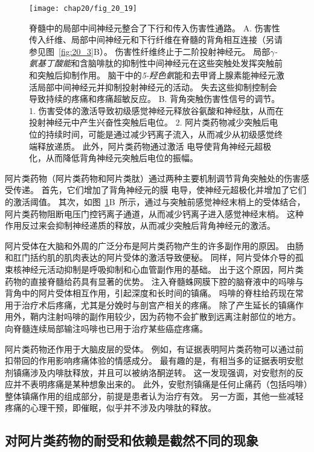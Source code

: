 \begin{figure}[htbp]
	\centering
	\texttt{[image: chap20/fig\_20\_19]}
	\caption{脊髓中的局部中间神经元整合了下行和传入伤害性通路。
		A. 伤害性传入纤维、局部中间神经元和下行纤维在脊髓的背角相互连接（另请参见图~\ref{fig:20_3}B）。
		伤害性纤维终止于二阶投射神经元。
		局部\textit{$\gamma$-氨基丁酸能}和含脑啡肽的抑制性中间神经元在这些突触处发挥突触前和突触后抑制作用。
		脑干中的\textit{5-羟色氨}能和去甲肾上腺素能神经元激活局部中间神经元并抑制投射神经元的活动。
		失去这些抑制控制会导致持续的疼痛和疼痛超敏反应。
		B. 背角突触伤害性信号的调节。
		1. 伤害受体的激活导致初级感觉神经元释放谷氨酸和神经肽，从而在投射神经元中产生兴奋性突触后电位。
		2. 阿片类药物减少突触后电位的持续时间，可能是通过减少钙离子流入，从而减少从初级感觉终端释放递质。
		此外，阿片类药物通过激活  电导使背角神经元超极化，从而降低背角神经元突触后电位的振幅。}
	\label{fig:20_19}
\end{figure}


阿片类药物（阿片类药物和阿片类肽）通过两种主要机制调节背角突触处的伤害感受传递。
首先，它们增加了背角神经元的膜  电导，使神经元超极化并增加了它们的激活阈值。
其次，如图~\ref{fig:20_19}B~所示，通过与突触前感觉神经末梢上的受体结合，阿片类药物阻断电压门控钙离子通道，从而减少钙离子进入感觉神经末梢。
这种作用反过来会抑制神经递质的释放，从而减少突触后背角神经元的激活。


阿片受体在大脑和外周的广泛分布是阿片类药物产生的许多副作用的原因。
由肠和肛门括约肌的肌肉表达的阿片受体的激活导致便秘。
同样，阿片受体介导的孤束核神经元活动抑制是呼吸抑制和心血管副作用的基础。
出于这个原因，阿片类药物的直接脊髓给药具有显著的优势。
注入脊髓蛛网膜下腔的脑脊液中的吗啡与背角中的阿片受体相互作用，引起深度和长时间的镇痛。
吗啡的脊柱给药现在常用于治疗术后疼痛，尤其是分娩时与剖宫产相关的疼痛。
除了产生延长的镇痛作用外，鞘内注射吗啡的副作用较少，因为药物不会扩散到远离注射部位的地方。
向脊髓连续局部输注吗啡也已用于治疗某些癌症疼痛。


阿片类药物还作用于大脑皮层的受体。
例如，有证据表明阿片类药物可以通过前扣带回的作用影响疼痛体验的情感成分。
最有趣的是，有相当多的证据表明安慰剂镇痛涉及内啡肽释放，并且可以被纳洛酮逆转。
这一发现强调，对安慰剂的反应并不表明疼痛是某种想象出来的。
此外，安慰剂镇痛是任何止痛药（包括吗啡）整体镇痛作用的组成部分，前提是患者认为治疗有效。
另一方面，其他一些减轻疼痛的心理干预，即催眠，似乎并不涉及内啡肽的释放。



\subsection{对阿片类药物的耐受和依赖是截然不同的现象}

